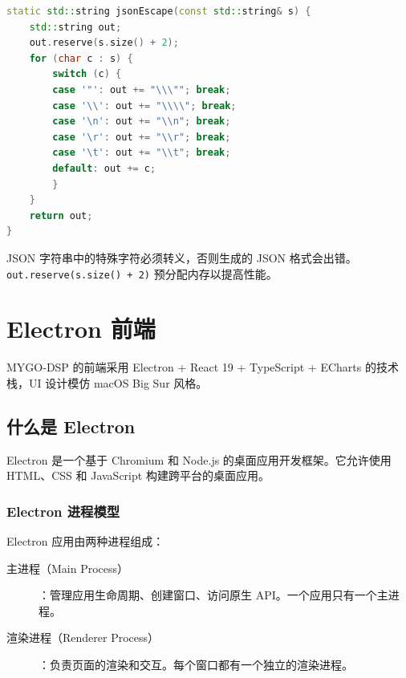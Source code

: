 ﻿\documentclass[12pt,a4paper,oneside]{ctexbook}
\begin{document}
\begin{lstlisting}[language=C++, caption={JSON 字符串转义}]
static std::string jsonEscape(const std::string& s) {
    std::string out;
    out.reserve(s.size() + 2);
    for (char c : s) {
        switch (c) {
        case '"': out += "\\\""; break;
        case '\\': out += "\\\\"; break;
        case '\n': out += "\\n"; break;
        case '\r': out += "\\r"; break;
        case '\t': out += "\\t"; break;
        default: out += c;
        }
    }
    return out;
}
\end{lstlisting}

JSON 字符串中的特殊字符必须转义，否则生成的 JSON 格式会出错。\texttt{out.reserve(s.size() + 2)} 预分配内存以提高性能。

\clearpage

\chapter{Electron 前端}

MYGO-DSP 的前端采用 Electron + React 19 + TypeScript + ECharts 的技术栈，UI 设计模仿 macOS Big Sur 风格。

\section{什么是 Electron}

Electron 是一个基于 Chromium 和 Node.js 的桌面应用开发框架。它允许使用 HTML、CSS 和 JavaScript 构建跨平台的桌面应用。

\subsection{Electron 进程模型}

Electron 应用由两种进程组成：

\begin{description}
    \item[主进程（Main Process）]：管理应用生命周期、创建窗口、访问原生 API。一个应用只有一个主进程。
    \item[渲染进程（Renderer Process）]：负责页面的渲染和交互。每个窗口都有一个独立的渲染进程。
\end{description}
\end{document}
